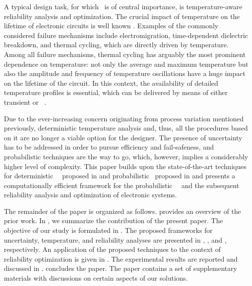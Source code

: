A typical design task, for which \ta\ is of central importance, is temperature-aware reliability analysis and optimization.
The crucial impact of temperature on the lifetime of electronic circuits is well known \cite{jedec}.
Examples of the commonly considered failure mechanisms include electromigration, time-dependent dielectric breakdown, and thermal cycling, which are directly driven by temperature.
Among all failure mechanisms, thermal cycling has arguably the most prominent dependence on temperature: not only the average and maximum temperature but also the amplitude and frequency of temperature oscillations have a huge impact on the lifetime of the circuit.
In this context, the availability of detailed temperature profiles is essential, which can be delivered by means of either transient or \DSS\ \ta.

Due to the ever-increasing concern originating from process variation mentioned previously, deterministic temperature analysis and, thus, all the procedures based on it are no longer a viable option for the designer.
The presence of uncertainty has to be addressed in order to pursue efficiency and fail-safeness, and probabilistic techniques are the way to go, which, however, implies a considerably higher level of complexity.
This paper builds upon the state-of-the-art techniques for deterministic \DSS\ \ta\ proposed in \cite{ukhov2012} and probabilistic \tta\ proposed in \cite{ukhov2014} and presents a computationally efficient framework for the probabilistic \DSS\ \ta\ and the subsequent reliability analysis and optimization of electronic systems.

The remainder of the paper is organized as follows.
 provides an overview of the prior work.
In , we summarize the contribution of the present paper.
The objective of our study is formulated in .
The proposed frameworks for uncertainty, temperature, and reliability analyses are presented in , , and , respectively.
An application of the proposed techniques to the context of reliability optimization is given in .
The experimental results are reported and discussed in .
 concludes the paper.
The paper contains a set of supplementary materials with discussions on certain aspects of our solutions.
